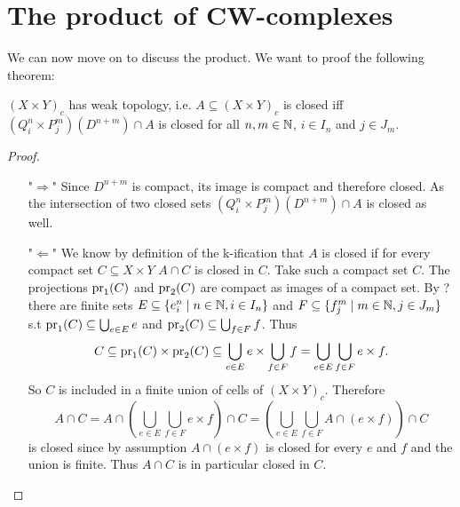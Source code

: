 \section{The product of CW-complexes}

We can now move on to discuss the product.
We want to proof the following theorem: 

\begin{thm}
    
\end{thm}

\begin{lem}
    $(X \times Y)_c$ has weak topology,
    i.e. $A \subseteq (X \times Y)_c$ is closed iff $(Q_i^n \times P_j^m)(D^{n + m}) \cap A$ is closed for all $n, m \in \mathbb{N}$, $i \in I_n$ and $j \in J_m$.
\end{lem}
\begin{proof}~
    \begin{enumerate}
        \item["$\Rightarrow$"] Since $D^{n + m}$ is compact, its image is compact and therefore closed. As the intersection of two closed sets $(Q_i^n \times P_j^m)(D^{n + m}) \cap A$ is closed as well.
        \item["$\Leftarrow$"] We know by definition of the k-ification that $A$ is closed if for every compact set $C \subseteq X \times Y$ $A \cap C$ is closed in $C$.
        Take such a compact set $C$.
        The projections $\text{pr}_{1}(C)$ and $\text{pr}_{2}(C)$ are compact as images of a compact set. 
        By ? there are finite sets $E \subseteq \{e_i^n \mid n \in \mathbb{N}, i \in I_n \}$ and $F \subseteq \{f_j^m \mid m \in \mathbb{N}, j \in J_m \}$ s.t $\text{pr}_{1}(C) \subseteq \bigcup_{e \in E} e$ and $\text{pr}_{2}(C) \subseteq \bigcup_{f \in F} f$.
        Thus 
        \[C \subseteq \text{pr}_{1}(C) \times \text{pr}_{2}(C) \subseteq \bigcup_{e \in E} e \times \bigcup_{f \in F} f = \bigcup_{e \in E} \bigcup_{f \in F} e \times f.\] 
        So $C$ is included in a finite union of cells of $(X \times Y)_c$. 
        Therefore 
        \[A \cap C = A \cap \left (\bigcup_{e \in E} \bigcup_{f \in F} e \times f \right )\cap C = \left (\bigcup_{e \in E} \bigcup_{f \in F} A \cap (e \times f)\right ) \cap C\] 
        is closed since by assumption $A \cap (e \times f)$ is closed for every $e$ and $f$ and the union is finite. Thus $A \cap C$ is in particular closed in $C$.
    \qedhere
    \end{enumerate}
\end{proof}
